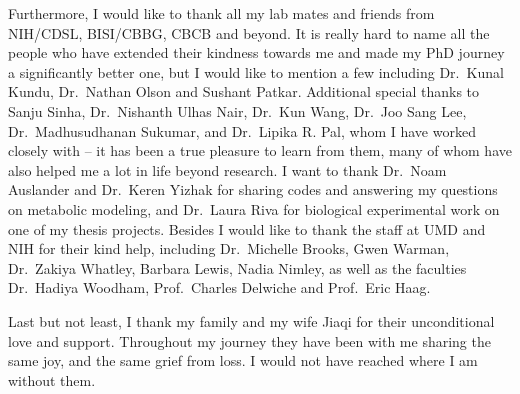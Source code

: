 \documentclass[12pt,twoside,openany,\mydriver]{thesis}  %
\renewcommand{\baselinestretch}{2}
\begin{document}
\begin{acknowledgements}
    Furthermore, I would like to thank all my lab mates and friends from NIH/CDSL, BISI/CBBG, CBCB and beyond. It is really hard to name all the people who have extended their kindness towards me and made my PhD journey a significantly better one, but I would like to mention a few including Dr.~Kunal Kundu, Dr.~Nathan Olson and Sushant Patkar. Additional special thanks to Sanju Sinha, Dr.~Nishanth Ulhas Nair, Dr.~Kun Wang, Dr.~Joo Sang Lee, Dr.~Madhusudhanan Sukumar, and Dr.~Lipika R. Pal, whom I have worked closely with -- it has been a true pleasure to learn from them, many of whom have also helped me a lot in life beyond research. I want to thank Dr.~Noam Auslander and Dr.~Keren Yizhak for sharing codes and answering my questions on metabolic modeling, and Dr.~Laura Riva for biological experimental work on one of my thesis projects. Besides I would like to thank the staff at UMD and NIH for their kind help, including Dr.~Michelle Brooks, Gwen Warman, Dr.~Zakiya Whatley, Barbara Lewis, Nadia Nimley, as well as the faculties Dr.~Hadiya Woodham, Prof.~Charles Delwiche and Prof.~Eric Haag.
    
    \par
    
    Last but not least, I thank my family and my wife Jiaqi for their unconditional love and support. Throughout my journey they have been with me sharing the same joy, and the same grief from loss. I would not have reached where I am without them.
  \end{acknowledgements}
\cleardoublepage
{}
{}
\renewcommand{\contentsname}{Table of Contents}
\renewcommand{\baselinestretch}{1}
\small\normalsize
\tableofcontents

  \cleardoublepage
  \renewcommand{\contentsname}{List of Tables}
  \listoftables

  \newpage
  \renewcommand{\contentsname}{List of Figures}
  \listoffigures
\end{document}
